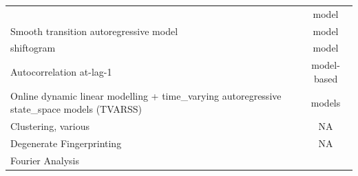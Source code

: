 \documentclass[12pt,twoside,openany]{reedthesis}
\begin{document}
\begin{longtable}[]{@{}lc@{}}
\begin{minipage}[t]{0.31\columnwidth}
\end{minipage} & \begin{minipage}[t]{0.35\columnwidth}\centering
model\strut
\end{minipage}\tabularnewline
\begin{minipage}[t]{0.31\columnwidth}\raggedright
Smooth
transition
autoregressive
model\strut
\end{minipage} & \begin{minipage}[t]{0.35\columnwidth}\centering
model\strut
\end{minipage}\tabularnewline
\begin{minipage}[t]{0.31\columnwidth}\raggedright
shiftogram\strut
\end{minipage} & \begin{minipage}[t]{0.35\columnwidth}\centering
model\strut
\end{minipage}\tabularnewline
\begin{minipage}[t]{0.31\columnwidth}\raggedright
Autocorrelation
at-lag-1\strut
\end{minipage} & \begin{minipage}[t]{0.35\columnwidth}\centering
model-based\strut
\end{minipage}\tabularnewline
\begin{minipage}[t]{0.31\columnwidth}\raggedright
Online dynamic
linear modelling
+ time\_varying
autoregressive
state\_space
models (TVARSS)\strut
\end{minipage} & \begin{minipage}[t]{0.35\columnwidth}\centering
models\strut
\end{minipage}\tabularnewline
\begin{minipage}[t]{0.31\columnwidth}\raggedright
Clustering,
various\strut
\end{minipage} & \begin{minipage}[t]{0.35\columnwidth}\centering
NA\strut
\end{minipage}\tabularnewline
\begin{minipage}[t]{0.31\columnwidth}\raggedright
Degenerate
Fingerprinting\strut
\end{minipage} & \begin{minipage}[t]{0.35\columnwidth}\centering
NA\strut
\end{minipage}\tabularnewline
\begin{minipage}[t]{0.31\columnwidth}\raggedright
Fourier Analysis\strut
\end{minipage} & \begin{minipage}[t]{0.35\columnwidth}\centering

\end{minipage}
\end{longtable}
\end{document}
